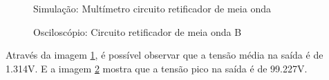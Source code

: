 \begin{figure}[H]
    \centering
    \caption{Simulação: Multímetro circuito retificador de meia onda}
    \vspace{-0.3cm}
    \label{fig:SimulacaoCircuito02}
\end{figure}

\begin{figure}[H]
    \centering
    \caption{Osciloscópio: Circuito retificador de meia onda B}
    \vspace{-0.3cm}
    \label{fig:OsciloscopioCircuito02}
\end{figure}

Através da imagem \ref{fig:SimulacaoCircuito02}, é possível observar que a tensão média na saída é de 1.314V. E a imagem \ref{fig:OsciloscopioCircuito02} mostra que a tensão pico na saída é de 99.227V.

